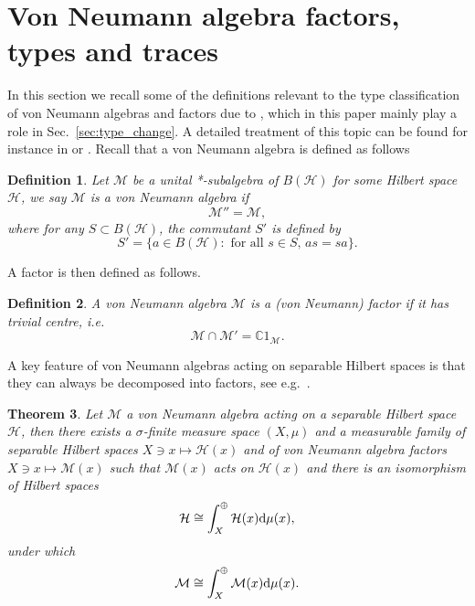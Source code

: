 \documentclass[sn-mathphys-num]{sn-jnl}%
\newcommand{\CC}{\mathbb{C}}
\newcommand{\HH}{\mathcal{H}}
\newcommand{\MM}{\mathcal{M}}
\newcommand{\diff}{\textup{d}}
\numberwithin{equation}{section}
\theoremstyle{thmstyleone}%
\newtheorem{theorem}{Theorem}[section]%
\theoremstyle{thmstyletwo}%
\theoremstyle{thmstylethree}%
\newtheorem{definition}[theorem]{Definition}%
\begin{document}
    \section{Von Neumann algebra factors, types and traces}
    \label{appx:factor_types}
    In this section we recall some of the definitions relevant to the type classification of von Neumann algebras and factors due to \cite{Murray_1936}, which in this paper mainly play a role in Sec.\ \ref{sec:type_change}. A detailed treatment of this topic can be found for instance in \cite{kadison1997fundamentals} or \cite{Takesaki2001}. Recall that a von Neumann algebra is defined as follows
    \begin{definition}
    \label{def:vNeumannAlg}
        Let $\MM$ be a unital *-subalgebra of $B(\HH)$ for some Hilbert space $\HH$, we say $\MM$ is a \textup{von Neumann algebra} if
        \begin{equation}
            \MM''=\MM,
        \end{equation}
        where for any $S\subset B(\HH)$, the commutant $S'$ is defined by
        \begin{equation}
            S'=\{a\in B(\HH):\text{ for all }s\in S,\, as=sa \}.
        \end{equation}
    \end{definition}
    A factor is then defined as follows.
    \begin{definition}
        A von Neumann algebra $\MM$ is a \textup{(von Neumann) factor} if it has trivial centre, i.e.
        \begin{equation}
            \MM\cap\MM'=\CC 1_{\MM}.
        \end{equation}
    \end{definition}
    A key feature of von Neumann algebras acting on separable Hilbert spaces is that they can always be decomposed into factors, see e.g.\ \cite[Thm.\ IV.8.21]{Takesaki2001}.
    \begin{theorem}
        Let $\MM$ a von Neumann algebra acting on a separable Hilbert space $\HH$, then there exists a $\sigma$-finite measure space $(X,\mu)$ and a measurable family of separable Hilbert spaces $X\ni x\mapsto \HH(x)$ and of von Neumann algebra factors $X\ni x\mapsto \MM(x)$ such that $\MM(x)$ acts on $\HH(x)$ and there is an isomorphism of Hilbert spaces
        \begin{equation}
            \HH\cong \int_X^\oplus\HH(x)\diff\mu(x),
        \end{equation}
        under which
        \begin{equation}
            \MM\cong \int_X^\oplus\MM(x)\diff\mu(x).
        \end{equation}
    \end{theorem}
\end{document}
